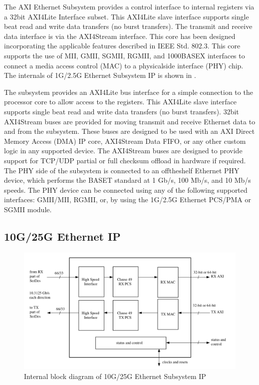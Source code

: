 The AXI Ethernet Subsystem provides a control interface to internal registers via a 32\textendash bit AXI4\textendash Lite Interface subset. This AXI4\textendash Lite slave interface supports single beat read and write data transfers (no burst transfers). The transmit and receive data interface is via the AXI4\textendash Stream interface. This core has been designed incorporating the applicable features described in IEEE Std. 802.3. This core supports the use of MII, GMII, SGMII, RGMII, and 1000BASE\textendash X interfaces to connect a media access control (MAC) to a physical\textendash side interface (PHY) chip. The internals of 1G/2.5G Ethernet Subsystem IP is shown in .

The subsystem provides an AXI4\textendash Lite bus interface for a simple connection to the processor core to allow access to the registers. This AXI4\textendash Lite slave interface supports single beat read and write data transfers (no burst transfers). 32\textendash bit AXI4\textendash Stream buses are provided for moving transmit and receive Ethernet data to and from the subsystem. These buses are designed to be used with an AXI Direct Memory Access (DMA) IP core, AXI4\textendash Stream Data FIFO, or any other custom logic in any supported device. The AXI4\textendash Stream buses are designed to provide support for TCP/UDP partial or full checksum offload in hardware if required. 
The PHY side of the subsystem is connected to an off\textendash the\textendash shelf Ethernet PHY device, which performs the BASE\textendash T standard at 1 Gb/s, 100 Mb/s, and 10 Mb/s speeds. The PHY device can be connected using any of the following supported interfaces: GMII/MII, RGMII, or, by using the 1G/2.5G Ethernet PCS/PMA or SGMII module.


\subsection{10G/25G Ethernet IP}

\begin{figure}[H]
\begin{center}
\includegraphics[width=\textwidth]{images/10G.png}
\caption{Internal block diagram of 10G/25G Ethernet Subsystem IP}
\label{10G}
\end{center}
\end{figure}

